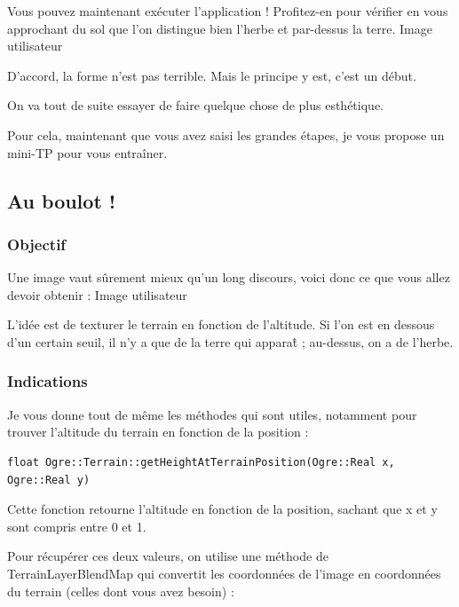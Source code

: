 \documentclass[10pt,a4paper]{report}
\begin{document}
Vous pouvez maintenant ex\'ecuter l'application ! Profitez-en pour v\'erifier en vous approchant du sol que l'on distingue bien l'herbe et par-dessus la terre.
Image utilisateur


D'accord, la forme n'est pas terrible. Mais le principe y est, c'est un d\'ebut.

On va tout de suite essayer de faire quelque chose de plus esth\'etique.

Pour cela, maintenant que vous avez saisi les grandes \'etapes, je vous propose un mini-TP pour vous entra\^iner.








\subsection{Au boulot !}



\subsubsection{Objectif}

Une image vaut s\^urement mieux qu'un long discours, voici donc ce que vous allez devoir obtenir :
Image utilisateur

L'id\'ee est de texturer le terrain en fonction de l'altitude. Si l'on est en dessous d'un certain seuil, il n'y a que de la terre qui appara\^t ; au-dessus, on a de l'herbe.



\subsubsection{Indications}

Je vous donne tout de m\^eme les m\'ethodes qui sont utiles, notamment pour trouver l'altitude du terrain en fonction de la position :

\begin{lstlisting}[caption={m\'ethode getHeightAtTerrainPosition pour trouver l'altitude du terrain en fonction de la position }]
float Ogre::Terrain::getHeightAtTerrainPosition(Ogre::Real x, Ogre::Real y)
\end{lstlisting}

Cette fonction retourne l'altitude en fonction de la position, sachant que x et y sont compris entre 0 et 1.

Pour r\'ecup\'erer ces deux valeurs, on utilise une m\'ethode de TerrainLayerBlendMap qui convertit les coordonn\'ees de l'image en coordonn\'ees du terrain (celles dont vous avez besoin) :
\end{document}
